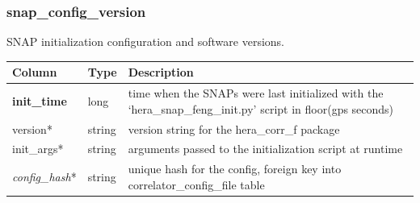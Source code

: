\documentclass{article}
\begin{document}
{\subsubsection{snap\_config\_version}
SNAP initialization configuration and software versions.
\begin{center}
 \begin{tabular}{| p{4cm} | p{2cm} | p{10cm} |}
\hline
 {\bf Column} & {\bf Type}  & {\bf Description} \\ [0.5ex]  \hline\hline
\textbf{init\_time} & long & time when the SNAPs were last initialized with the `hera\_snap\_feng\_init.py' script in floor(gps seconds)\\ \hline
version* & string & version string for the hera\_corr\_f package \\\hline
init\_args* & string & arguments passed to the initialization script at runtime \\\hline
\textit{config\_hash}* & string & unique hash for the config, foreign key into correlator\_config\_file table \\\hline
\end{tabular}
\end{center}

}
\end{document}

